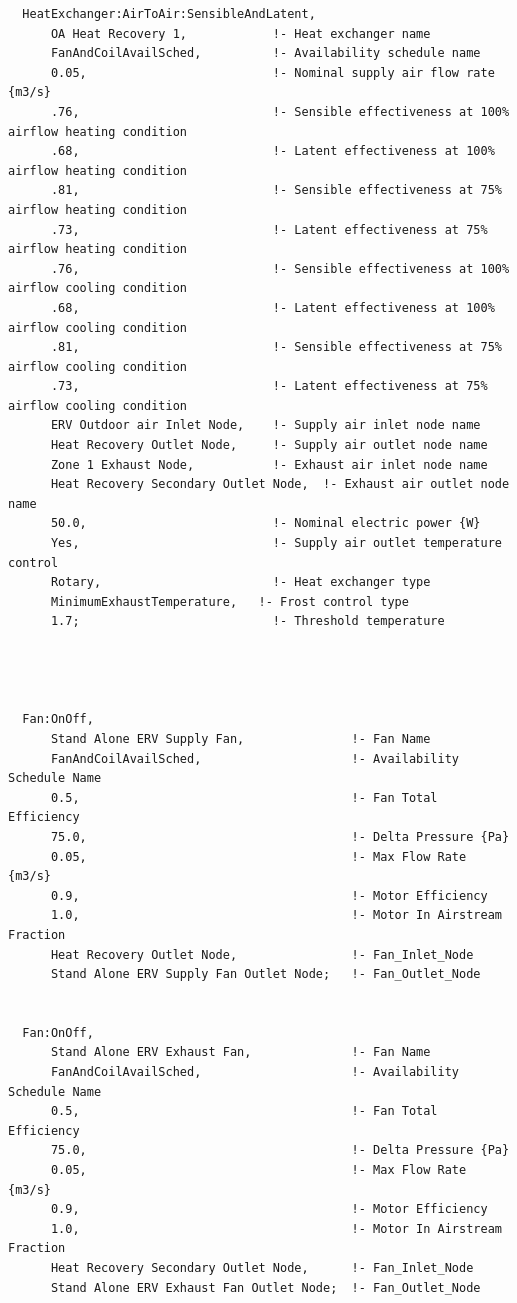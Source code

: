 \begin{lstlisting}
  HeatExchanger:AirToAir:SensibleAndLatent,
      OA Heat Recovery 1,            !- Heat exchanger name
      FanAndCoilAvailSched,          !- Availability schedule name
      0.05,                          !- Nominal supply air flow rate {m3/s}
      .76,                           !- Sensible effectiveness at 100% airflow heating condition
      .68,                           !- Latent effectiveness at 100% airflow heating condition
      .81,                           !- Sensible effectiveness at 75% airflow heating condition
      .73,                           !- Latent effectiveness at 75% airflow heating condition
      .76,                           !- Sensible effectiveness at 100% airflow cooling condition
      .68,                           !- Latent effectiveness at 100% airflow cooling condition
      .81,                           !- Sensible effectiveness at 75% airflow cooling condition
      .73,                           !- Latent effectiveness at 75% airflow cooling condition
      ERV Outdoor air Inlet Node,    !- Supply air inlet node name
      Heat Recovery Outlet Node,     !- Supply air outlet node name
      Zone 1 Exhaust Node,           !- Exhaust air inlet node name
      Heat Recovery Secondary Outlet Node,  !- Exhaust air outlet node name
      50.0,                          !- Nominal electric power {W}
      Yes,                           !- Supply air outlet temperature control
      Rotary,                        !- Heat exchanger type
      MinimumExhaustTemperature,   !- Frost control type
      1.7;                           !- Threshold temperature




  Fan:OnOff,
      Stand Alone ERV Supply Fan,               !- Fan Name
      FanAndCoilAvailSched,                     !- Availability Schedule Name
      0.5,                                      !- Fan Total Efficiency
      75.0,                                     !- Delta Pressure {Pa}
      0.05,                                     !- Max Flow Rate {m3/s}
      0.9,                                      !- Motor Efficiency
      1.0,                                      !- Motor In Airstream Fraction
      Heat Recovery Outlet Node,                !- Fan_Inlet_Node
      Stand Alone ERV Supply Fan Outlet Node;   !- Fan_Outlet_Node


  Fan:OnOff,
      Stand Alone ERV Exhaust Fan,              !- Fan Name
      FanAndCoilAvailSched,                     !- Availability Schedule Name
      0.5,                                      !- Fan Total Efficiency
      75.0,                                     !- Delta Pressure {Pa}
      0.05,                                     !- Max Flow Rate {m3/s}
      0.9,                                      !- Motor Efficiency
      1.0,                                      !- Motor In Airstream Fraction
      Heat Recovery Secondary Outlet Node,      !- Fan_Inlet_Node
      Stand Alone ERV Exhaust Fan Outlet Node;  !- Fan_Outlet_Node



\end{lstlisting}
